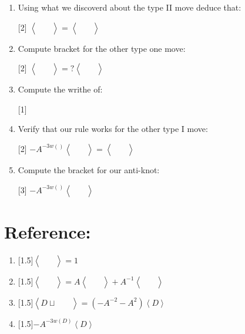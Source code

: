 \documentclass[14pt]{extarticle}
\newcommand{\LP}{\left(}
\newcommand{\RP}{\right)}
\newcommand{\LA}{\left\langle}
\newcommand{\RA}{\right\rangle}
\newcommand{\img}[1]{\begin{aligned}
    &\ \\
    &\\
    &\
\end{aligned}}
\newcommand{\bkt}[1]{\LA\img{#1}\RA}
\begin{document}
\pagestyle{fancy}
\fancyhf{}


\begin{enumerate}
\item{
Using what we discoverd about the type II move deduce that:
\vspace{-2cm}
\begin{center}
\scalebox{2}[2]{
$\bkt{1.svg}=\bkt{6.svg}$
}
\end{center}
}
\vspace{5cm}

\item{
Compute bracket for the other type one move:
\vspace{-2cm}
\begin{center}
\scalebox{2}[2]{
    ${\LA\img{t1.svg}\RA=?\LA\img{t1_2.svg}\RA}$
    }
\end{center}
}
\newpage


\item{
Compute the writhe of:
\begin{center}
    \scalebox{1}[1]{
        $$
        }
\end{center}}

\vspace{5cm}
\item{
Verify that our rule works for the other type I move:
\vspace{-1cm}
\begin{center}
    \scalebox{2}[2]{
        $-A^{-3w\LP \RP}\LA\img{t1.svg}\RA=\LA\img{t1_2.svg}\RA$
        }
\end{center}}
\newpage
\item{
Compute the bracket for our anti-knot:
\vspace{-3cm}
\begin{center}
    \scalebox{3}[3]{
        $-A^{-3w\LP \RP}\LA\img{right.svg}\RA$
        }
\end{center}}
\end{enumerate}
\newpage
\section*{Reference:}
\begin{enumerate}
        \item{ \scalebox{1.5}[1.5]{${\LA \img{unknot.svg} \RA=1}$}\vspace{-2cm}}
        \item{ \scalebox{1.5}[1.5]{$\LA \img{crossing_un.svg}\RA=A\LA \img{6a.svg} \RA+A^{-1}\LA\img{6b.svg}\RA$}\vspace{-2cm}}
        \item{ \scalebox{1.5}[1.5]{${\LA D \sqcup \img{unknot.svg} \RA=\LP-A^{-2}-A^2\RP\LA D\RA}$}\vspace{-1cm}}
        \item{ \scalebox{1.5}[1.5]{$-A^{-3w\LP D\RP}\LA D\RA$}}
\end{enumerate}
\end{document}
